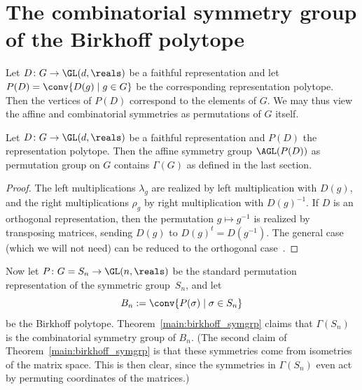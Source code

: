 \section{The combinatorial symmetry group of the Birkhoff polytope}
Let $D\colon G \to \GL(d,\reals)$ be a faithful representation
and let $P(D) = \conv\{ D(g) \mid g\in G \}$
be the corresponding representation polytope.
Then the vertices of $P(D)$ correspond to the elements of $G$.
We may thus view the affine and combinatorial symmetries
as permutations of $G$ itself.

\begin{lemma}\label{l:reppoltrivsyms}
  Let 
  $D\colon G\to \GL(d,\reals)$
  be a faithful representation
  and $P(D)$ the representation polytope.  
  Then the affine symmetry group $\AGL(P(D))$ 
  as permutation group on $G$ contains 
  $\Gamma(G)$ as defined in the last section.
\end{lemma}

\begin{proof}
  The left multiplications $\lambda_g$ are realized
  by left multiplication with 
  $D(g)$, and the right multiplications $\rho_g$
  by right multiplication with $D(g)^{-1}$.
  If $D$ is an orthogonal representation, then the 
  permutation $g\mapsto g^{-1}$ is realized by transposing 
  matrices, sending $D(g) $ to $D(g)^t = D(g^{-1})$.
  The general case (which we will not need)
  can be reduced to the orthogonal 
  case~\cite[Prop.~6.4]{FrieseLadisch16}.
\end{proof}



Now let $P\colon G= S_n \to \GL(n,\reals)$ be the 
standard permutation representation of 
the symmetric group~$S_n$, and let
\[ B_n := \conv\{ P(\sigma) \mid \sigma\in S_n\}
\]
be the Birkhoff polytope.
Theorem~\ref{main:birkhoff_symgrp} claims that 
$\Gamma(S_n)$ is the combinatorial symmetry group of
$B_n$.
(The second claim of Theorem~\ref{main:birkhoff_symgrp} is that
these symmetries come from isometries of the matrix space.
This is then clear, since
the symmetries in $\Gamma(S_n)$ even act by permuting coordinates of
the matrices.)

